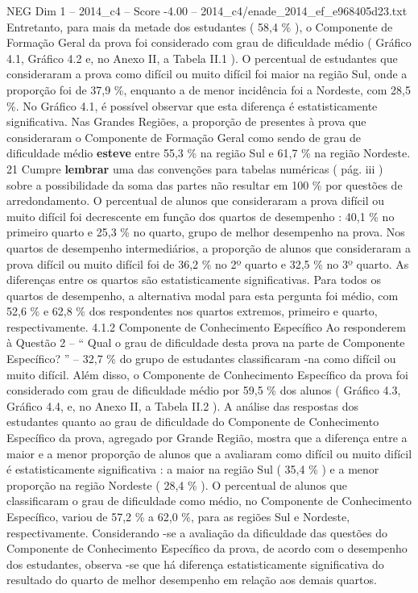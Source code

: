 \begin{textsample}{NEG Dim 1 – 2014\_c4 – Score -4.00 – 2014\_c4/enade\_2014\_ef\_e968405d23.txt}
Entretanto, para mais da metade dos estudantes ( 58,4 \% ), o Componente de Formação Geral da prova foi considerado com grau de dificuldade médio ( Gráfico 4.1, Gráfico 4.2 e, no Anexo II, a Tabela II.1 ).
O percentual de estudantes que consideraram a prova como difícil ou muito difícil foi maior na região Sul, onde a proporção foi de 37,9 \%, enquanto a de menor incidência foi a Nordeste, com 28,5 \%.
No Gráfico 4.1, é possível observar que esta diferença é estatisticamente significativa.
Nas Grandes Regiões, a proporção de presentes à prova que consideraram o Componente de Formação Geral como sendo de grau de dificuldade médio \textbf{esteve} entre 55,3 \% na região Sul e 61,7 \% na região Nordeste. 21 Cumpre \textbf{lembrar} uma das convenções para tabelas numéricas ( pág. iii ) sobre a possibilidade da soma das partes não resultar em 100 \% por questões de arredondamento.
O percentual de alunos que consideraram a prova difícil ou muito difícil foi decrescente em função dos quartos de desempenho : 40,1 \% no primeiro quarto e 25,3 \% no quarto, grupo de melhor desempenho na prova.
Nos quartos de desempenho intermediários, a proporção de alunos que consideraram a prova difícil ou muito difícil foi de 36,2 \% no 2º quarto e 32,5 \% no 3º quarto.
As diferenças entre os quartos são estatisticamente significativas.
Para todos os quartos de desempenho, a alternativa modal para esta pergunta foi médio, com 52,6 \% e 62,8 \% dos respondentes nos quartos extremos, primeiro e quarto, respectivamente. 4.1.2 Componente de Conhecimento Específico Ao responderem à Questão 2 – “ Qual o grau de dificuldade desta prova na parte de Componente Específico? ” – 32,7 \% do grupo de estudantes classificaram -na como difícil ou muito difícil.
Além disso, o Componente de Conhecimento Específico da prova foi considerado com grau de dificuldade médio por 59,5 \% dos alunos ( Gráfico 4.3, Gráfico 4.4, e, no Anexo II, a Tabela II.2 ).
A análise das respostas dos estudantes quanto ao grau de dificuldade do Componente de Conhecimento Específico da prova, agregado por Grande Região, mostra que a diferença entre a maior e a menor proporção de alunos que a avaliaram como difícil ou muito difícil é estatisticamente significativa : a maior na região Sul ( 35,4 \% ) e a menor proporção na região Nordeste ( 28,4 \% ).
O percentual de alunos que classificaram o grau de dificuldade como médio, no Componente de Conhecimento Específico, variou de 57,2 \% a 62,0 \%, para as regiões Sul e Nordeste, respectivamente.
Considerando -se a avaliação da dificuldade das questões do Componente de Conhecimento Específico da prova, de acordo com o desempenho dos estudantes, observa -se que há diferença estatisticamente significativa do resultado do quarto de melhor desempenho em relação aos demais quartos.

\end{textsample}
